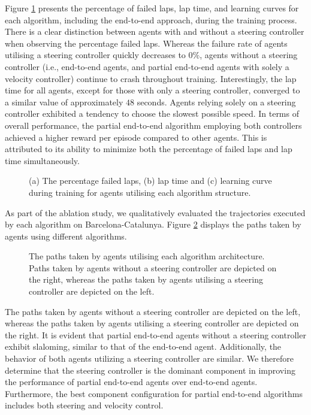 Figure \ref{fig:architecture_train} presents the percentage of failed laps, lap time, and learning curves for each algorithm, including the end-to-end approach, during the training process.
There is a clear distinction between agents with and without a steering controller when observing the percentage failed laps.
Whereas the failure rate of agents utilising a steering controller quickly decreases to $0\%$, agents without a steering controller (i.e., end-to-end agents, and partial end-to-end agents with solely a velocity controller) continue to crash throughout training.
Interestingly, the lap time for all agents, except for those with only a steering controller, converged to a similar value of approximately $48$ seconds. 
Agents relying solely on a steering controller exhibited a tendency to choose the slowest possible speed.
In terms of overall performance, the partial end-to-end algorithm employing both controllers achieved a higher reward per episode compared to other agents. 
This is attributed to its ability to minimize both the percentage of failed laps and lap time simultaneously.


\begin{figure}[htb!]
    \centering
    
    \caption[Learning curves for agents utilising each algorithm structure]{(a) The percentage failed laps, (b) lap time and (c) learning curve during training for agents utilising each algorithm structure.}
    \label{fig:architecture_train}
\end{figure}

As part of the ablation study, we qualitatively evaluated the trajectories executed by each algorithm on Barcelona-Catalunya.
Figure \ref{fig:architecture_esp} displays the paths taken by agents using different algorithms.
\begin{figure}[b]
    \centering
    
    \caption[Paths taken by agents utilising each algorithm architecture]{The paths taken by agents utilising each algorithm architecture. Paths taken by agents without a steering controller are depicted on the right, whereas the paths taken by agents utilising a steering controller are depicted on the left.}
    \label{fig:architecture_esp}
\end{figure}
The paths taken by agents without a steering controller are depicted on the left, whereas the paths taken by agents utilising a steering controller are depicted on the right.
It is evident that partial end-to-end agents without a steering controller exhibit slaloming, similar to that of the end-to-end agent. 
Additionally, the behavior of both agents utilizing a steering controller are similar.
We therefore determine that the steering controller is the dominant component in improving the performance of partial end-to-end agents over end-to-end agents. 
Furthermore, the best component configuration for partial end-to-end algorithms includes both steering and velocity control.


